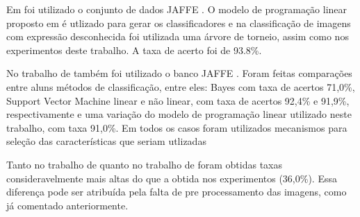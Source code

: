 Em  foi utilizado o conjunto de dados JAFFE \cite{Jaffe}. O modelo de programação linear proposto em  é utlizado para gerar os classificadores e na classificação de imagens com expressão desconhecida foi utilizada uma árvore de torneio, assim como nos experimentos deste trabalho. A taxa de acerto foi de 93.8\%.

No trabalho de  também foi utilizado o banco JAFFE \cite{Jaffe}. Foram feitas comparações entre aluns métodos de classificação, entre eles: Bayes com taxa de acertos 71,0\%, Support Vector Machine linear e não linear, com taxa de acertos 92,4\% e 91,9\%, respectivamente e uma variação do modelo de programação linear utilizado neste trabalho, com taxa 91,0\%. Em todos os casos foram utilizados mecanismos para seleção das características que seriam utlizadas
 
Tanto no trabalho de  quanto no trabalho de  foram obtidas taxas consideravelmente mais altas do que a obtida nos experimentos (36,0\%). Essa diferença pode ser atribuída pela falta de pre processamento das imagens, como já comentado anteriormente.
